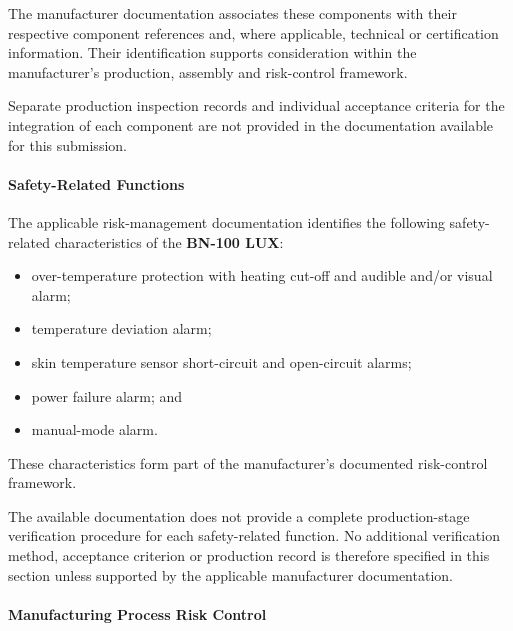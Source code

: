 The manufacturer documentation associates these components with
their respective component references and, where applicable,
technical or certification information. Their identification
supports consideration within the manufacturer's production,
assembly and risk-control framework.

Separate production inspection records and individual acceptance
criteria for the integration of each component are not provided
in the documentation available for this submission.


\paragraph{Safety-Related Functions}

The applicable risk-management documentation identifies the
following safety-related characteristics of the
\textbf{BN-100 LUX}:

\begin{itemize}
    \item over-temperature protection with heating cut-off and
    audible and/or visual alarm;
    \item temperature deviation alarm;
    \item skin temperature sensor short-circuit and open-circuit
    alarms;
    \item power failure alarm; and
    \item manual-mode alarm.
\end{itemize}

These characteristics form part of the manufacturer's documented
risk-control framework.

The available documentation does not provide a complete
production-stage verification procedure for each safety-related
function. No additional verification method, acceptance criterion
or production record is therefore specified in this section unless
supported by the applicable manufacturer documentation.


\paragraph{Manufacturing Process Risk Control}

